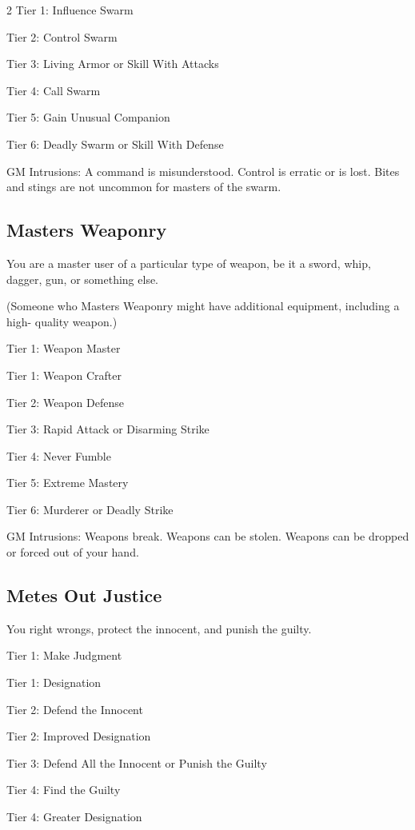 \begin{multicols}{2}
Tier 1: Influence Swarm

Tier 2: Control Swarm

Tier 3: Living Armor or Skill With Attacks

Tier 4: Call Swarm

Tier 5: Gain Unusual Companion

Tier 6: Deadly Swarm or Skill With Defense

GM Intrusions: A command is misunderstood. Control is erratic or is lost. Bites and stings are not uncommon for masters of the swarm.

\subsection{Masters Weaponry}

You are a master user of a particular type of weapon, be it a sword, whip, dagger, gun, or something else.

(Someone who Masters Weaponry might have additional equipment, including a high- quality weapon.)

Tier 1: Weapon Master

Tier 1: Weapon Crafter

Tier 2: Weapon Defense

Tier 3: Rapid Attack or Disarming Strike

Tier 4: Never Fumble

Tier 5: Extreme Mastery

Tier 6: Murderer or Deadly Strike

GM Intrusions: Weapons break. Weapons can be stolen. Weapons can be dropped or forced out of your hand.

\subsection{Metes Out Justice}

You right wrongs, protect the innocent, and punish the guilty.

Tier 1: Make Judgment

Tier 1: Designation

Tier 2: Defend the Innocent

Tier 2: Improved Designation

Tier 3: Defend All the Innocent or Punish the Guilty

Tier 4: Find the Guilty

Tier 4: Greater Designation


\end{multicols}
